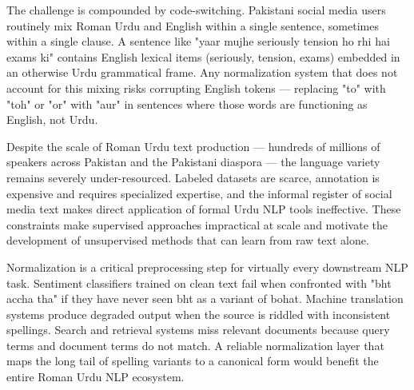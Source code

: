 \documentclass[11pt]{article}
\begin{document}
The challenge is compounded by code-switching. Pakistani social media users routinely mix Roman Urdu and English within a single sentence, sometimes within a single clause. A sentence like "yaar mujhe seriously tension ho rhi hai exams ki" contains English lexical items (seriously, tension, exams) embedded in an otherwise Urdu grammatical frame. Any normalization system that does not account for this mixing risks corrupting English tokens — replacing "to" with "toh" or "or" with "aur" in sentences where those words are functioning as English, not Urdu.

Despite the scale of Roman Urdu text production — hundreds of millions of speakers across Pakistan and the Pakistani diaspora — the language variety remains severely under-resourced. Labeled datasets are scarce, annotation is expensive and requires specialized expertise, and the informal register of social media text makes direct application of formal Urdu NLP tools ineffective. These constraints make supervised approaches impractical at scale and motivate the development of unsupervised methods that can learn from raw text alone.

Normalization is a critical preprocessing step for virtually every downstream NLP task. Sentiment classifiers trained on clean text fail when confronted with "bht accha tha" if they have never seen bht as a variant of bohat. Machine translation systems produce degraded output when the source is riddled with inconsistent spellings. Search and retrieval systems miss relevant documents because query terms and document terms do not match. A reliable normalization layer that maps the long tail of spelling variants to a canonical form would benefit the entire Roman Urdu NLP ecosystem.
\end{document}
